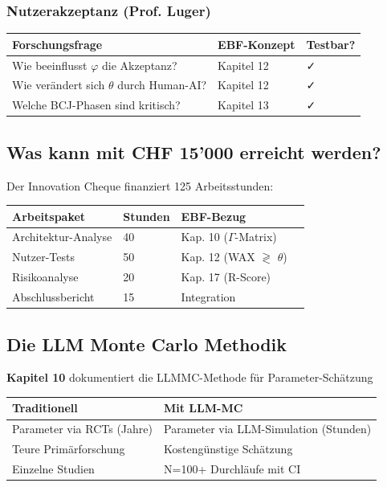\documentclass[11pt,a4paper]{article}
\begin{document}
\subsubsection{Nutzerakzeptanz (Prof. Luger)}

\begin{center}
\begin{tabular}{lll}
\toprule
\textbf{Forschungsfrage} & \textbf{EBF-Konzept} & \textbf{Testbar?} \\
\midrule
Wie beeinflusst $\varphi$ die Akzeptanz? & Kapitel 12 & ✓ \\
Wie verändert sich $\theta$ durch Human-AI? & Kapitel 12 & ✓ \\
Welche BCJ-Phasen sind kritisch? & Kapitel 13 & ✓ \\
\bottomrule
\end{tabular}
\end{center}

\subsection{Was kann mit CHF 15'000 erreicht werden?}

Der Innovation Cheque finanziert 125 Arbeitsstunden:

\begin{center}
\begin{tabular}{llll}
\toprule
\textbf{Arbeitspaket} & \textbf{Stunden} & \textbf{EBF-Bezug} \\
\midrule
Architektur-Analyse & 40 & Kap. 10 ($\Gamma$-Matrix) \\
Nutzer-Tests & 50 & Kap. 12 (WAX $\gtrless$ $\theta$) \\
Risikoanalyse & 20 & Kap. 17 (R-Score) \\
Abschlussbericht & 15 & Integration \\
\bottomrule
\end{tabular}
\end{center}

\subsection{Die LLM Monte Carlo Methodik}

\begin{ebfbox}
\textbf{Kapitel 10} dokumentiert die LLMMC-Methode für Parameter-Schätzung
\end{ebfbox}

\begin{center}
\begin{tabular}{ll}
\toprule
\textbf{Traditionell} & \textbf{Mit LLM-MC} \\
\midrule
Parameter via RCTs (Jahre) & Parameter via LLM-Simulation (Stunden) \\
Teure Primärforschung & Kostengünstige Schätzung \\
Einzelne Studien & N=100+ Durchläufe mit CI \\
\bottomrule
\end{tabular}
\end{center}
\end{document}
